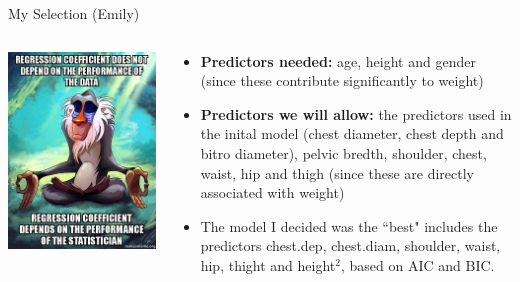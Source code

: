\documentclass[table]{beamer}\usepackage[]{graphicx}\usepackage[]{color}
\begin{document}
\begin{frame}{My Selection (Emily)}

\begin{columns}[t] %
\begin{column}[T]{5cm} %
\includegraphics[width=\textwidth]{rafiki}
\end{column}

\begin{column}[T]{7cm} 

\begin{itemize}
\item \textbf{Predictors needed:} age, height and gender (since these contribute significantly to weight) \\

\item \textbf{Predictors we will allow:} the predictors used in the inital model (chest diameter, chest depth and bitro diameter), pelvic bredth, shoulder, chest, waist, hip and thigh (since these are directly associated with weight)\\

\item The model I decided was the ``best" includes the predictors chest.dep, chest.diam, shoulder, waist, hip, thight and height$^2$, based on AIC and BIC.  \\
\end{itemize}

\end{column}
\end{columns}

\end{frame}
\end{document}
